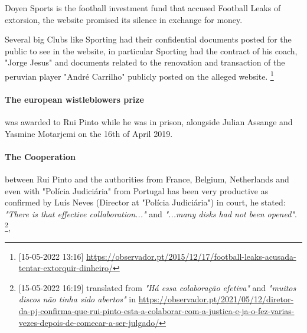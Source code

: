 Doyen Sports is the football investment fund that accused Football Leaks of extorsion, the website promised its silence in exchange for money.

Several big Clubs like Sporting had their confidential documents posted for the public to see in the website, in particular Sporting had the contract of his coach, "Jorge Jesus" and documents related to the renovation and transaction of the peruvian player "André Carrilho" publicly posted on the alleged website.
\footnote{[15-05-2022 13:16] \url{https://observador.pt/2015/12/17/football-leaks-acusada-tentar-extorquir-dinheiro/}}

\paragraph{The european wistleblowers prize} was awarded to Rui Pinto while he was in prison, alongside Julian Assange and Yasmine Motarjemi on the 16th of April 2019.

\paragraph{The Cooperation} between Rui Pinto and the authorities from France, Belgium, Netherlands and even with "Polícia Judiciária" from Portugal has been very productive as confirmed by Luís Neves (Director at "Polícia Judiciária") in court, he stated: \textit{"There is that effective collaboration..."} and \textit{"...many disks had not been opened"}.
\footnote{ [15-05-2022 16:19] translated from \textit{"Há essa colaboração efetiva"} and \textit{"muitos discos não tinha sido abertos"} in \url{https://observador.pt/2021/05/12/diretor-da-pj-confirma-que-rui-pinto-esta-a-colaborar-com-a-justica-e-ja-o-fez-varias-vezes-depois-de-comecar-a-ser-julgado/} },  



